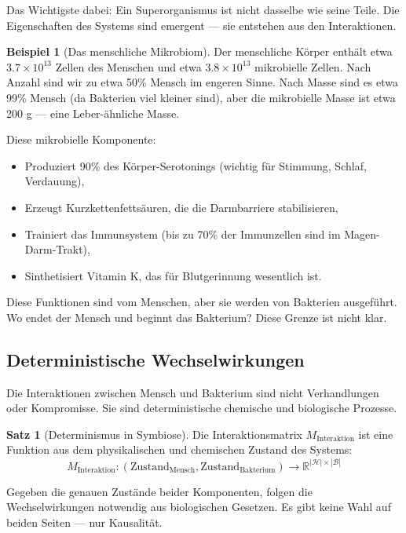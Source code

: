 \documentclass[a4paper,12pt]{article}
\theoremstyle{definition}
\newtheorem{beispiel}{Beispiel}
\newtheorem{satz}{Satz}
\begin{document}
Das Wichtigste dabei: Ein Superorganismus ist nicht dasselbe wie seine Teile. Die Eigenschaften des Systems sind emergent --- sie entstehen aus den Interaktionen.

\begin{beispiel}[Das menschliche Mikrobiom]
Der menschliche Körper enthält etwa $3.7 \times 10^{13}$ Zellen des Menschen und etwa $3.8 \times 10^{13}$ mikrobielle Zellen. Nach Anzahl sind wir zu etwa 50\% Mensch im engeren Sinne. Nach Masse sind es etwa 99\% Mensch (da Bakterien viel kleiner sind), aber die mikrobielle Masse ist etwa 200 g --- eine Leber-ähnliche Masse.

Diese mikrobielle Komponente:
\begin{itemize}
    \item[-] Produziert 90\% des Körper-Serotonings (wichtig für Stimmung, Schlaf, Verdauung),
    \item[-] Erzeugt Kurzkettenfettsäuren, die die Darmbarriere stabilisieren,
    \item[-] Trainiert das Immunsystem (bis zu 70\% der Immunzellen sind im Magen-Darm-Trakt),
    \item[-] Sinthetisiert Vitamin K, das für Blutgerinnung wesentlich ist.
\end{itemize}

Diese Funktionen sind vom Menschen, aber sie werden von Bakterien ausgeführt. Wo endet der Mensch und beginnt das Bakterium? Diese Grenze ist nicht klar.
\end{beispiel}

\subsection{Deterministische Wechselwirkungen}

Die Interaktionen zwischen Mensch und Bakterium sind nicht Verhandlungen oder Kompromisse. Sie sind deterministische chemische und biologische Prozesse.

\begin{satz}[Determinismus in Symbiose]
Die Interaktionsmatrix $M_{\text{Interaktion}}$ ist eine Funktion aus dem physikalischen und chemischen Zustand des Systems:
\[
M_{\text{Interaktion}}: (\text{Zustand}_{\text{Mensch}}, \text{Zustand}_{\text{Bakterium}}) \to \mathbb{R}^{|\mathcal{H}| \times |\mathcal{B}|}
\]

Gegeben die genauen Zustände beider Komponenten, folgen die Wechselwirkungen notwendig aus biologischen Gesetzen. Es gibt keine Wahl auf beiden Seiten --- nur Kausalität.
\end{satz}
\end{document}

